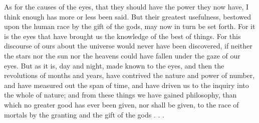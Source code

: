  As for the causes of the eyes, that they should have the power they now have, I think enough has more or less been said. But their greatest usefulness, bestowed upon the human race by the gift of the gods, may now in turn be set forth. For it is the eyes that have brought us the knowledge of the best of things. For this discourse of ours about the universe would never have been discovered, if neither the stars nor the sun nor the heavens could have fallen under the gaze of our eyes. But as it is, day and night, made known to the eyes, and then the revolutions of months and years, have contrived the nature and power of number, and have measured out the span of time, and have driven us to the inquiry into the whole of nature; and from these things we have gained philosophy, than which no greater good has ever been given, nor shall be given, to the race of mortals by the granting and the gift of the gods . . .

